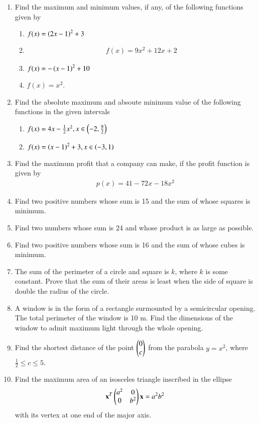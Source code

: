 \renewcommand{\theequation}{\theenumi}
\begin{enumerate}[label=\thesubsection.\arabic*.,ref=\thesubsection.\theenumi]


\item Find the maximum and minimum values, if any, of the following functions given by 
%
\begin{enumerate}
\item $f(x) = \left(2x-1\right)^2+3$
\item 
\begin{align}
    f(x)=9x^2+12x+2 
\end{align}
%
\solution

\item $f(x) = -\left(x-1\right)^2+10$
\item $f(x) = x^2$.
\end{enumerate}
\item Find the absolute maximum and absoute minimum value of the following functions in the given intervals
%
\begin{enumerate}
\item $f(x) = 4x - \frac{1}{2}x^2, x \in \left(-2,\frac{9}{2}\right)$
\item $f(x) = \left(x-1\right)^2 + 3,  x \in \left(-3,1\right)$
\end{enumerate}
%
\item Find the maximum profit that a company can make, if the profit function is given by
\begin{align}
p(x) = 41-72x - 18x^2
\end{align}
%
\item Find two positive numbers whose sum is 15 and the sum of whose squares is minimum.
\item Find two numbers whose sum is 24 and whose product is as large as possible.
\item Find two positive numbers whose sum is 16 and the sum of whose cubes is minimum.
\item The sum of the perimeter of a circle and square is $k$, where $k$ is some constant. Prove that the sum of their areas is least when the side of square is double the radius of the circle.
\item A window is in the form of a rectangle surmounted by a semicircular opening. The total perimeter of the window is 10 m. Find the dimensions of the window to admit maximum light through the whole opening.

\item Find the shortest distance of the point $\begin{pmatrix}0\\c\end{pmatrix}$ from the parabola $y = x^2$, where $\frac{1}{2} \le c \le 5$.
\item Find the maximum area of an isosceles triangle inscribed in the ellipse 
%
\begin{align}
\mathbf{x}^T\begin{pmatrix}a^2 & 0 \\ 0 & b^2\end{pmatrix}\mathbf{x} = a^2b^2
\end{align}
%
with its vertex at one end of the major axis.


\end{enumerate}
%

